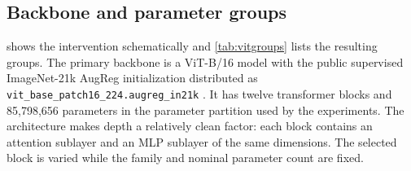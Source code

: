 \documentclass[11pt]{article}
\newcommand{\method}[1]{\texttt{#1}}
\begin{document}
\subsection{Backbone and parameter groups}

 shows the intervention schematically and \cref{tab:vitgroups} lists the resulting groups. The primary backbone is a ViT-B/16 model with the public supervised ImageNet-21k AugReg initialization distributed as \method{vit\_base\_patch16\_224.augreg\_in21k} \cite{vit2021,steiner2022}. It has twelve transformer blocks and 85,798,656 parameters in the parameter partition used by the experiments. The architecture makes depth a relatively clean factor: each block contains an attention sublayer and an MLP sublayer of the same dimensions. The selected block is varied while the family and nominal parameter count are fixed.
\end{document}
